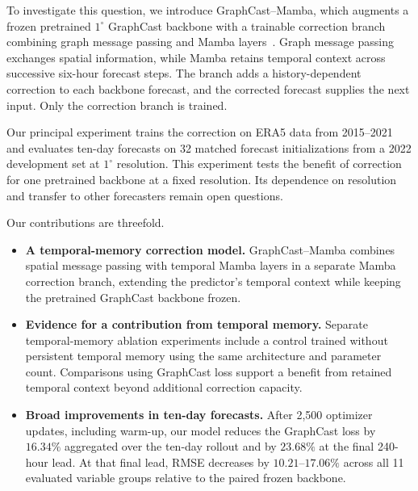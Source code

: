 \documentclass{article}
\newcommand{\suozhi}[1]{}
\renewcommand{\suozhi}[1]{}
\begin{document}

{To investigate this question, we introduce GraphCast--Mamba, which augments a frozen pretrained $1^\circ$ GraphCast backbone with a trainable correction branch combining graph message passing and Mamba layers~\citep{lam2023graphcast,gu2023mamba}. Graph message passing exchanges spatial information, while Mamba retains temporal context across successive six-hour forecast steps. The branch adds a history-dependent correction to each backbone forecast, and the corrected forecast supplies the next input. Only the correction branch is trained.}

{Our principal experiment trains the correction on ERA5 data from 2015--2021 and evaluates ten-day forecasts on 32 matched forecast initializations from a 2022 development set at $1^\circ$ resolution. This experiment tests the benefit of correction for one pretrained backbone at a fixed resolution. Its dependence on resolution and transfer to other forecasters remain open questions.}

Our contributions are threefold.
\begin{itemize}
    \item \textbf{A temporal-memory correction model.} GraphCast--Mamba combines spatial message passing with temporal Mamba layers in a separate Mamba correction branch, extending the predictor's temporal context while keeping the pretrained GraphCast backbone frozen.
    \item \textbf{Evidence for a contribution from temporal memory.} Separate temporal-memory ablation experiments include a control trained without persistent temporal memory using the same architecture and parameter count. Comparisons using {GraphCast loss} support a benefit from retained temporal context beyond additional correction capacity.
    \item \textbf{Broad improvements in ten-day forecasts.} After 2,500 optimizer updates, including warm-up, our model reduces the {GraphCast loss} by $16.34\%$ aggregated over the ten-day rollout and by $23.68\%$ at the final 240-hour lead. At that final lead, RMSE decreases by $10.21$--$17.06\%$ across all 11 evaluated variable groups relative to the paired frozen backbone.
\end{itemize}
\end{document}
